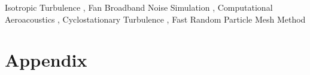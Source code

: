 \documentclass[preprint,3p,11pt,times]{elsarticle}
\begin{document}
\begin{frontmatter}
\begin{abstract}


\end{abstract}

\begin{keyword}

Isotropic Turbulence \sep
Fan Broadband Noise Simulation \sep 
Computational Aeroacoustics \sep
Cyclostationary Turbulence \sep   
Fast Random Particle Mesh Method
\end{keyword}
\end{frontmatter}

% 





\appendix
\renewcommand\thefigure{\arabic{figure}}  
\section{Appendix}




\end{document}
